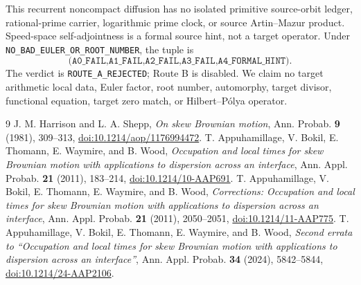 \documentclass[10pt]{article}
\begin{document}
This recurrent noncompact diffusion has no isolated primitive source-orbit
ledger, rational-prime carrier, logarithmic prime clock, or source
Artin--Mazur product.  Speed-space self-adjointness is a formal source hint,
not a target operator.  Under
\texttt{NO\_BAD\_EULER\_OR\_ROOT\_NUMBER}, the tuple is
\[
\texttt{(A0\_FAIL,A1\_FAIL,A2\_FAIL,A3\_FAIL,A4\_FORMAL\_HINT)}.
\]
The verdict is \texttt{ROUTE\_A\_REJECTED}; Route B is disabled.  We claim no
target arithmetic local data, Euler factor, root number, automorphy, target
divisor, functional equation, target zero match, or Hilbert--P\'olya operator.

{\small\sloppy{}
\begin{thebibliography}{9}
 J. M. Harrison and L. A. Shepp,
\emph{On skew Brownian motion}, Ann. Probab. \textbf{9} (1981), 309--313,
\href{https://doi.org/10.1214/aop/1176994472}{doi:10.1214/aop/1176994472}.
 T. Appuhamillage, V. Bokil, E. Thomann, E. Waymire, and B. Wood,
\emph{Occupation and local times for skew Brownian motion with applications
to dispersion across an interface}, Ann. Appl. Probab. \textbf{21} (2011),
183--214,
\href{https://doi.org/10.1214/10-AAP691}{doi:10.1214/10-AAP691}.
 T. Appuhamillage, V. Bokil, E. Thomann, E. Waymire, and B. Wood,
\emph{Corrections: Occupation and local times for skew Brownian motion with
applications to dispersion across an interface}, Ann. Appl. Probab.
\textbf{21} (2011), 2050--2051,
\href{https://doi.org/10.1214/11-AAP775}{doi:10.1214/11-AAP775}.
 T. Appuhamillage, V. Bokil, E. Thomann, E. Waymire, and B. Wood,
\emph{Second errata to ``Occupation and local times for skew Brownian motion
with applications to dispersion across an interface''}, Ann. Appl. Probab.
\textbf{34} (2024), 5842--5844,
\href{https://doi.org/10.1214/24-AAP2106}{doi:10.1214/24-AAP2106}.
\end{thebibliography}
}
\end{document}

